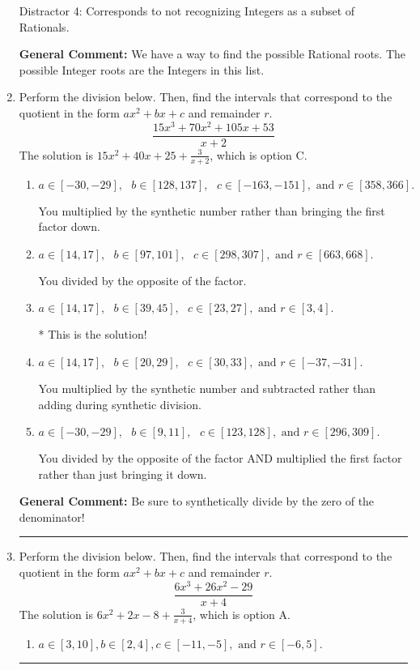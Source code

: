 \documentclass{extbook}[14pt]
\newcommand{\litem}[1]{\item #1

\rule{\textwidth}{0.4pt}}
\begin{document}
\begin{enumerate}
{\begin{enumerate}[label=\Alph*.]
 Distractor 4: Corresponds to not recognizing Integers as a subset of Rationals.
\end{enumerate}

\textbf{General Comment:} We have a way to find the possible Rational roots. The possible Integer roots are the Integers in this list.
}
\litem{
Perform the division below. Then, find the intervals that correspond to the quotient in the form $ax^2+bx+c$ and remainder $r$.
\[ \frac{15x^{3} +70 x^{2} +105 x + 53}{x + 2} \]The solution is \( 15x^{2} +40 x + 25 + \frac{3}{x + 2} \), which is option C.\begin{enumerate}[label=\Alph*.]
\item \( a \in [-30, -29], \text{   } b \in [128, 137], \text{   } c \in [-163, -151], \text{   and   } r \in [358, 366]. \)

 You multiplied by the synthetic number rather than bringing the first factor down.
\item \( a \in [14, 17], \text{   } b \in [97, 101], \text{   } c \in [298, 307], \text{   and   } r \in [663, 668]. \)

 You divided by the opposite of the factor.
\item \( a \in [14, 17], \text{   } b \in [39, 45], \text{   } c \in [23, 27], \text{   and   } r \in [3, 4]. \)

* This is the solution!
\item \( a \in [14, 17], \text{   } b \in [20, 29], \text{   } c \in [30, 33], \text{   and   } r \in [-37, -31]. \)

 You multiplied by the synthetic number and subtracted rather than adding during synthetic division.
\item \( a \in [-30, -29], \text{   } b \in [9, 11], \text{   } c \in [123, 128], \text{   and   } r \in [296, 309]. \)

 You divided by the opposite of the factor AND multiplied the first factor rather than just bringing it down.
\end{enumerate}

\textbf{General Comment:} Be sure to synthetically divide by the zero of the denominator!
}
\litem{
Perform the division below. Then, find the intervals that correspond to the quotient in the form $ax^2+bx+c$ and remainder $r$.
\[ \frac{6x^{3} +26 x^{2} -29}{x + 4} \]The solution is \( 6x^{2} +2 x -8 + \frac{3}{x + 4} \), which is option A.\begin{enumerate}[label=\Alph*.]
\item \( a \in [3, 10], b \in [2, 4], c \in [-11, -5], \text{ and } r \in [-6, 5]. \)


\end{enumerate}}
\end{enumerate}
\end{document}
